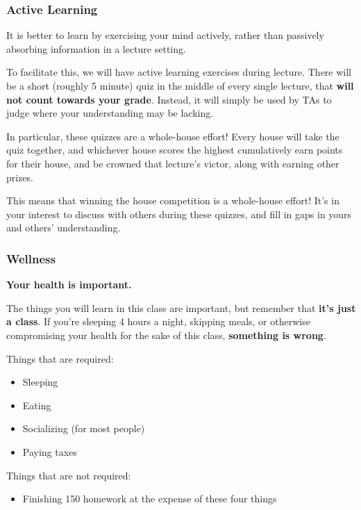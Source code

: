 \documentclass[aspectratio=169]{beamer}
\begin{document}
\begin{frame}[fragile]
  \frametitle{Active Learning}

  It is better to learn by exercising your mind actively, rather than passively absorbing
  information in a lecture setting.

  \pause
  \vspace{\fill}

  To facilitate this, we will have active learning exercises during lecture. There will be
  a short (roughly 5 minute) quiz in the middle of every single lecture, that \textbf{will not 
  count towards your grade}. Instead, it will simply be used by TAs to judge where your
  understanding may be lacking.

  \pause
  \vspace{\fill}

  In particular, these quizzes are a whole-house effort! Every house will take the quiz 
  together, and whichever house scores the highest cumulatively earn points for their house,
  and be crowned that lecture's victor, along with earning other prizes.

  \pause
  \vspace{\fill}

  This means that winning the house competition is a whole-house effort! It's in your interest
  to discuss with others during these quizzes, and fill in gaps in yours and others' 
  understanding.
\end{frame}
  
\begin{frame}[fragile]
  \frametitle{Wellness}

  \textbf{Your health is important.}

  \pause
  \vspace{\fill}

  The things you will learn in this class are important, but remember that
  \textbf{it's just a class}. If you're sleeping 4 hours a night, skipping meals, 
  or otherwise compromising your health for the sake of this class, \textbf{something
  is wrong}.

  \pause
  \vspace{\fill}

  Things that are required:
  \begin{itemize}
    \item Sleeping \pause
    \item Eating \pause 
    \item Socializing (for most people) \pause 
    \item Paying taxes 
  \end{itemize}

  \pause
  \vspace{\fill}
  
  Things that are not required:
  \begin{itemize}
    \item Finishing 150 homework at the expense of these four things\footnotemark 
  \end{itemize}

\end{frame}
\end{document}
